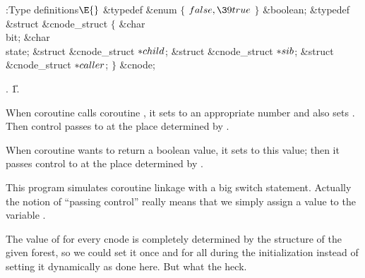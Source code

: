 \Y\B\4:Type definitions\X${}\E{}$\6
\&{typedef} \&{enum} ${}\{{}$\1\6
${}\\{false},\39\\{true}{}$\2\6
${}\}{}$ \&{boolean};\7
\&{typedef} \&{struct} \&{cnode\_struct} ${}\{{}$\1\6
\&{char} \\{bit};\6
\&{char} \\{state};\6
\&{struct} \&{cnode\_struct} ${}{*}\\{child}{}$;\6
\&{struct} \&{cnode\_struct} ${}{*}\\{sib}{}$;\6
\&{struct} \&{cnode\_struct} ${}{*}\\{caller}{}$;\2\6
${}\}{}$ \&{cnode};\par
{}.
\U1.\fi

When coroutine  calls coroutine , it
sets  to an
appropriate number and also sets . Then control
passes
to  at the place determined by .

When coroutine  wants to return a boolean value, it sets  to this
value; then it passes control to  at the place
determined
by .

This program simulates coroutine linkage with a big switch statement.
Actually the notion of ``passing control'' really means that we simply
assign a value to the variable .

The value of  for every cnode  is completely
determined by the
structure of the given forest, so we could set it once and for all during
the initialization instead of setting it dynamically as done here.
But what the heck.

